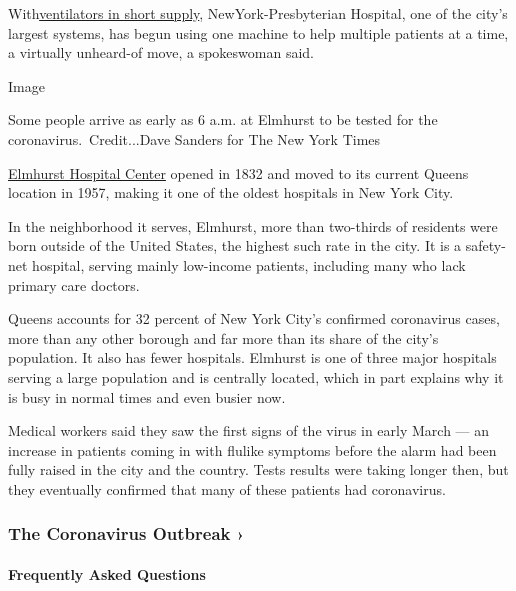 With\href{https://www.nytimes.com/video/us/politics/100000007051271/cuomo-coronavirus-update.html}{ventilators
in short supply}, NewYork-Presbyterian Hospital, one of the city's
largest systems, has begun using one machine to help multiple patients
at a time, a virtually unheard-of move, a spokeswoman said.

Image

Some people arrive as early as 6 a.m. at Elmhurst to be tested for the
coronavirus.~Credit...Dave Sanders for The New York Times

\href{https://www.nychealthandhospitals.org/wp-content/uploads/2016/07/chna-elmhurst-2013.pdf}{Elmhurst
Hospital Center} opened in 1832 and moved to its current Queens location
in 1957, making it one of the oldest hospitals in New York City.

In the neighborhood it serves, Elmhurst, more than two-thirds of
residents were born outside of the United States, the highest such rate
in the city. It is a safety-net hospital, serving mainly low-income
patients, including many who lack primary care doctors.

Queens accounts for 32 percent of New York City's confirmed coronavirus
cases, more than any other borough and far more than its share of the
city's population. It also has fewer hospitals. Elmhurst is one of three
major hospitals serving a large population and is centrally located,
which in part explains why it is busy in normal times and even busier
now.

Medical workers said they saw the first signs of the virus in early
March --- an increase in patients coming in with flulike symptoms before
the alarm had been fully raised in the city and the country. Tests
results were taking longer then, but they eventually confirmed that many
of these patients had coronavirus.

\href{https://www.nytimes.com/news-event/coronavirus?action=click\&pgtype=Article\&state=default\&region=MAIN_CONTENT_3\&context=storylines_faq}{}

\hypertarget{the-coronavirus-outbreak-}{%
\subsubsection{The Coronavirus Outbreak
›}\label{the-coronavirus-outbreak-}}

\hypertarget{frequently-asked-questions}{%
\paragraph{Frequently Asked
Questions}\label{frequently-asked-questions}}

